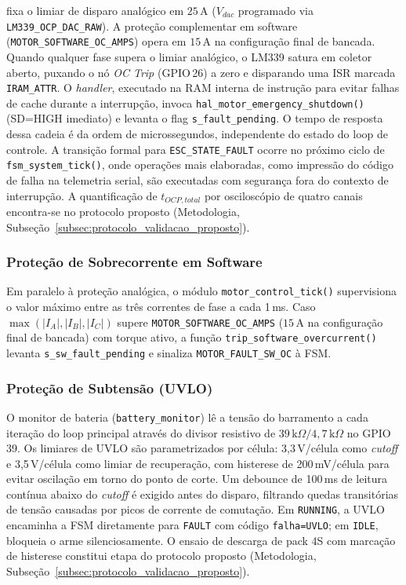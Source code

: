 fixa o limiar de disparo analógico em $25\,\text{A}$ ($V_{dac}$ programado via \texttt{LM339\_OCP\_DAC\_RAW}). A proteção complementar em software (\texttt{MOTOR\_SOFTWARE\_OC\_AMPS}) opera em $15\,\text{A}$ na configuração final de bancada. Quando qualquer fase supera o limiar analógico, o LM339 satura em coletor aberto, puxando o nó \textit{OC Trip} (GPIO\,26) a zero e disparando uma ISR marcada \texttt{IRAM\_ATTR}. O \textit{handler}, executado na RAM interna de instrução para evitar falhas de cache durante a interrupção, invoca \texttt{hal\_motor\_emergency\_shutdown()} (SD=HIGH imediato) e levanta o flag \texttt{s\_fault\_pending}. O tempo de resposta dessa cadeia é da ordem de microssegundos, independente do estado do loop de controle. A transição formal para \texttt{ESC\_STATE\_FAULT} ocorre no próximo ciclo de \texttt{fsm\_system\_tick()}, onde operações mais elaboradas, como impressão do código de falha na telemetria serial, são executadas com segurança fora do contexto de interrupção. A quantificação de $t_{OCP,total}$ por osciloscópio de quatro canais encontra-se no protocolo proposto (Metodologia, Subseção~\ref{subsec:protocolo_validacao_proposto}).

\subsubsection{Proteção de Sobrecorrente em Software}

Em paralelo à proteção analógica, o módulo \texttt{motor\_control\_tick()} supervisiona o valor máximo entre as três correntes de fase a cada 1\,ms. Caso $\max(|I_A|, |I_B|, |I_C|)$ supere \texttt{MOTOR\_SOFTWARE\_OC\_AMPS} ($15\,\text{A}$ na configuração final de bancada) com torque ativo, a função \texttt{trip\_software\_overcurrent()} levanta \texttt{s\_sw\_fault\_pending} e sinaliza \texttt{MOTOR\_FAULT\_SW\_OC} à FSM.

\subsubsection{Proteção de Subtensão (UVLO)}

O monitor de bateria (\texttt{battery\_monitor}) lê a tensão do barramento a cada iteração do loop principal através do divisor resistivo de $39\,\text{k}\Omega / 4{,}7\,\text{k}\Omega$ no GPIO\,39. Os limiares de UVLO são parametrizados por célula: 3,3\,V/célula como \textit{cutoff} e 3,5\,V/célula como limiar de recuperação, com histerese de 200\,mV/célula para evitar oscilação em torno do ponto de corte. Um debounce de 100\,ms de leitura contínua abaixo do \textit{cutoff} é exigido antes do disparo, filtrando quedas transitórias de tensão causadas por picos de corrente de comutação. Em \texttt{RUNNING}, a UVLO encaminha a FSM diretamente para \texttt{FAULT} com código \texttt{falha=UVLO}; em \texttt{IDLE}, bloqueia o arme silenciosamente. O ensaio de descarga de pack 4S com marcação de histerese constitui etapa do protocolo proposto (Metodologia, Subseção~\ref{subsec:protocolo_validacao_proposto}).

